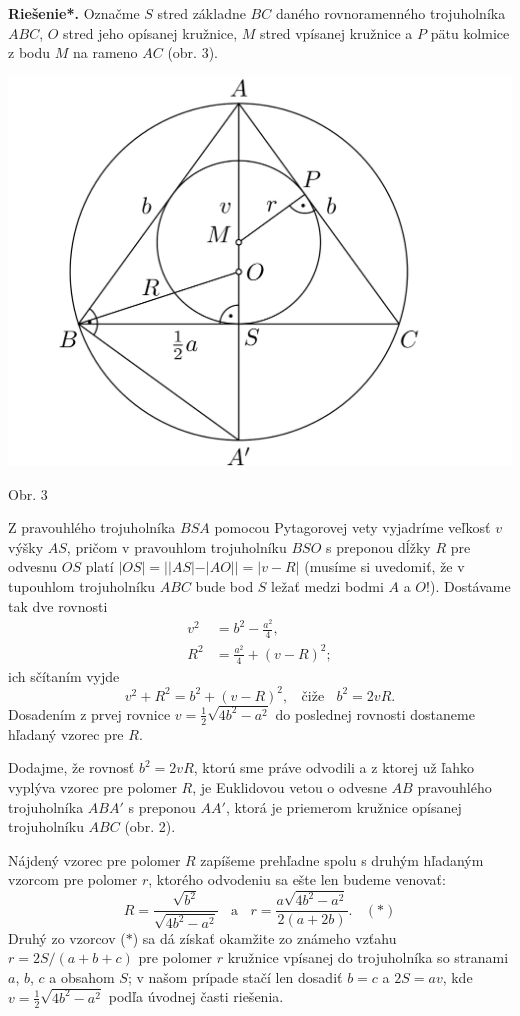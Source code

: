 \documentclass[11pt,a4paper,oneside,final]{book}
\newcommand{\rieh}{\textbf{Riešenie*.} }
\begin{document}
\rieh Označme $S$ stred základne $BC$ daného rovnoramenného trojuholníka $ABC$, $O$ stred jeho opísanej kružnice, $M$ stred vpísanej kružnice a $P$ pätu kolmice z bodu $M$ na rameno $AC$ (obr. 3).
\begin{center}
\includegraphics[scale=0.35]{61D5_pozor}

Obr. 3
\end{center}
Z pravouhlého trojuholníka $BSA$ pomocou Pytagorovej vety vyjadríme veľkosť $v$ výšky $AS$, pričom v pravouhlom trojuholníku $BSO$ s preponou dĺžky $R$ pre odvesnu $OS$ platí $|OS| =||AS|-|AO|| = |v-R|$ (musíme si uvedomiť, že v tupouhlom trojuholníku $ABC$ bude bod $S$ ležať medzi bodmi $A$ a $O$!). Dostávame tak dve rovnosti
\begin{align*}
v^2 &= b^2 -\frac{a^2}{4},\\
R^2 &= \frac{a^2}{4}+ (v -R)^2;
\end{align*}
ich sčítaním vyjde
$$v^2+ R^2= b^2 + (v - R)^2,\ \ \ \ \text{čiže} \ \ \ \  b^2= 2vR.$$
Dosadením z prvej rovnice $v =\frac{1}{2}\sqrt{4b^2- a^2}$ do poslednej rovnosti dostaneme hľadaný vzorec pre $R$.

Dodajme, že rovnosť $b^2 = 2vR$, ktorú sme práve odvodili a z ktorej už ľahko vyplýva vzorec pre polomer $R$, je Euklidovou vetou o odvesne $AB$ pravouhlého trojuholníka $ABA'$ s preponou $AA'$, ktorá je priemerom kružnice opísanej trojuholníku $ABC$ (obr. 2).

Nájdený vzorec pre polomer $R$ zapíšeme prehľadne spolu s druhým hľadaným vzorcom pre polomer $r$, ktorého odvodeniu sa ešte len budeme venovať:
$$R =\frac{\sqrt{b^2}}{\sqrt{4b^2 - a^2}}\ \ \ \ \text{a}\ \ \ \  r = \frac{a\sqrt{4b^2-a^2}}{2(a+2b)}.\ \ \ \  (\ast)$$
Druhý zo vzorcov ($\ast$) sa dá získať okamžite zo známeho vzťahu $r = 2S/(a + b + c)$ pre polomer $r$ kružnice vpísanej do trojuholníka so stranami $a$, $b$, $c$ a obsahom $S$;
v našom prípade stačí len dosadiť $b = c$ a $2S = av$, kde $v = \frac{1}{2}\sqrt{4b^2 - a^2}$ podľa úvodnej časti riešenia.
\end{document}
